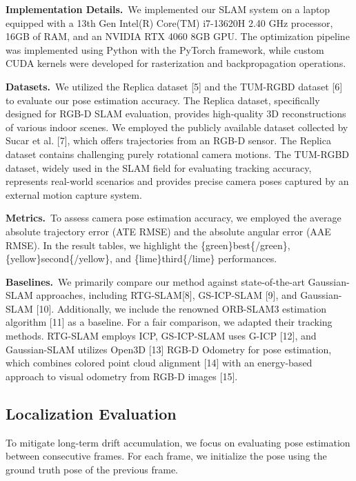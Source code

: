 \documentclass[twocolumn]{article} %
\begin{document}
\textbf{Implementation Details.}~We implemented our SLAM system on a
laptop equipped with a 13th Gen Intel(R) Core(TM) i7-13620H 2.40 GHz
processor, 16GB of RAM, and an NVIDIA RTX 4060 8GB GPU. The optimization
pipeline was implemented using Python with the PyTorch framework, while
custom CUDA kernels were developed for rasterization and backpropagation
operations.

\textbf{Datasets.}~We utilized the Replica dataset {[}5{]} and the
TUM-RGBD dataset {[}6{]} to evaluate our pose estimation accuracy. The
Replica dataset, specifically designed for RGB-D SLAM evaluation,
provides high-quality 3D reconstructions of various indoor scenes. We
employed the publicly available dataset collected by Sucar et al.
{[}7{]}, which offers trajectories from an RGB-D sensor. The Replica
dataset contains challenging purely rotational camera motions. The
TUM-RGBD dataset, widely used in the SLAM field for evaluating tracking
accuracy, represents real-world scenarios and provides precise camera
poses captured by an external motion capture system.

\textbf{Metrics.}~To assess camera pose estimation accuracy, we employed
the average absolute trajectory error (ATE RMSE) and the absolute
angular error (AAE RMSE). In the result tables, we highlight the
\{green\}best\{/green\}, \{yellow\}second\{/yellow\}, and
\{lime\}third\{/lime\} performances.

\textbf{Baselines.}~We primarily compare our method against
state-of-the-art Gaussian-SLAM approaches, including RTG-SLAM{[}8{]},
GS-ICP-SLAM {[}9{]}, and Gaussian-SLAM {[}10{]}. Additionally, we
include the renowned ORB-SLAM3 estimation algorithm {[}11{]} as a
baseline. For a fair comparison, we adapted their tracking methods.
RTG-SLAM employs ICP, GS-ICP-SLAM uses G-ICP {[}12{]}, and Gaussian-SLAM
utilizes Open3D {[}13{]} RGB-D Odometry for pose estimation, which
combines colored point cloud alignment {[}14{]} with an energy-based
approach to visual odometry from RGB-D images {[}15{]}.

\subsection{Localization Evaluation}\label{localization-evaluation}

To mitigate long-term drift accumulation, we focus on evaluating pose
estimation between consecutive frames. For each frame, we initialize the
pose using the ground truth pose of the previous frame.
\end{document}
